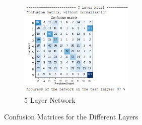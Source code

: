 \documentclass{article}
\begin{document}
\begin{figure}[h!]
\begin{subfigure}[t]{0.45\textwidth}
            \includegraphics[width=0.6\textwidth]{5Layer_cm}
            \caption{5 Layer Network}
        \end{subfigure}
        \caption{Confusion Matrices for the Different Layers}
    \end{figure}
    \newpage
\end{document}

